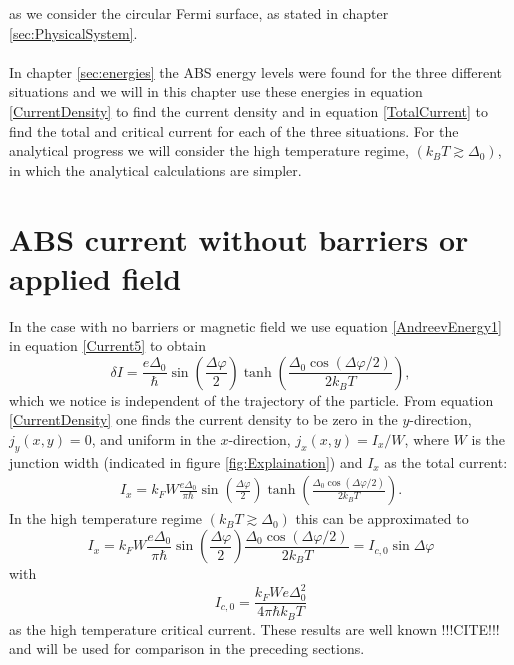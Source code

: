 as we consider the circular Fermi surface, as stated in chapter \ref{sec:PhysicalSystem}.
\\
\\
In chapter \ref{sec:energies} the ABS energy levels were found for the three different situations and we will in this chapter use these energies in equation \eqref{CurrentDensity} to find the current density and in equation \eqref{TotalCurrent} to find the total and critical current for each of the three situations. For the analytical progress we will consider the high temperature regime, $(k_BT \gtrsim \Delta_0)$, in which the analytical calculations are simpler.

\section{ABS current without barriers or applied field}
\label{sec:CurrentWithout}
In the case with no barriers or magnetic field we use equation \eqref{AndreevEnergy1} in equation \eqref{Current5} to obtain
\begin{equation}
    \delta I = \frac{e\Delta_0}{\hbar}\sin\left(\frac{\Delta\varphi}{2}\right)\tanh\left(\frac{\Delta_0\cos(\Delta\varphi/2)}{2k_BT}\right),
\end{equation}
which we notice is independent of the trajectory of the particle. From equation \eqref{CurrentDensity} one finds the current density to be zero in the $y$-direction, $j_y(x,y) = 0$, and uniform in the $x$-direction, $j_x(x,y) = I_x/W$, where $W$ is the junction width (indicated in figure \ref{fig:Explaination}) and $I_x$ as the total current:
\begin{equation}
\begin{split}
   I_x = k_F W\frac{e\Delta_0}{\pi \hbar} \sin\left(\frac{\Delta\varphi}{2}\right)\tanh\left(\frac{\Delta_0\cos(\Delta\varphi/2)}{2k_BT}\right).
\end{split}
\label{TotalCurrent}
\end{equation}
In the high temperature regime $(k_BT \gtrsim \Delta_0)$ this can be approximated to
\begin{equation}
    I_x = k_F W\frac{e\Delta_0}{\pi \hbar} \sin\left(\frac{\Delta\varphi}{2}\right)\frac{\Delta_0\cos(\Delta\varphi/2)}{2k_BT} = I_{c,0}\sin \Delta \varphi
\label{WithoutField}
\end{equation}
with 
\begin{equation}
    I_{c,0} = \frac{k_F W e\Delta_0^2}{4\pi \hbar k_BT}
\label{Ic0-highT}
\end{equation}
as the high temperature critical current. These results are well known !!!CITE!!! and will be used for comparison in the preceding sections. 


